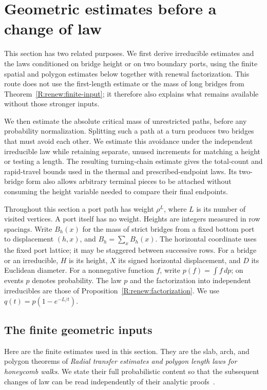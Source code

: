 \section{Geometric estimates before a change of law}\label{R:geo:section}

This section has two related purposes.  We first derive irreducible
estimates and the laws conditioned on bridge height or on two boundary
ports, using the finite spatial and polygon estimates below together
with renewal factorization.  This route does not use the first-length
estimate or the mass of long bridges from Theorem~\ref{R:renew:finite-input};
it therefore also explains what remains available without those stronger
inputs.

We then estimate the absolute critical mass of unrestricted paths, before
any probability normalization.  Splitting such a path at a turn produces
two bridges that must avoid each other.  We estimate this avoidance under
the independent irreducible law while retaining separate, unused
increments for matching a height or testing a length.  The resulting
turning-chain estimate gives the total-count and rapid-travel bounds used
in the thermal and prescribed-endpoint laws.  Its two-bridge form also
allows arbitrary terminal pieces to be attached without consuming the
height variable needed to compare their final endpoints.

Throughout this section a port path has weight $\rho^L$, where $L$ is its
number of visited vertices.  A port itself has no weight.  Heights are
integers measured in row spacings.  Write $B_h(x)$ for the mass of strict
bridges from a fixed bottom port to displacement $(h,x)$, and
$B_h=\sum_xB_h(x)$.  The horizontal coordinate uses the fixed port lattice;
it may be staggered between successive rows.  For a bridge or an
irreducible, $H$ is its height, $X$ its signed horizontal displacement,
and $D$ its Euclidean diameter.  For a nonnegative function $f$, write
$p(f)=\int f\,dp$; on events $p$ denotes probability.  The law $p$ and the
factorization into independent irreducibles are those of
Proposition~\ref{R:renew:factorization}.  We use $q(t)=p(1-e^{-L/t})$.

\subsection{The finite geometric inputs}\label{R:geo:finite-inputs}

Here are the finite estimates used in this section.  They are the slab,
arch, and polygon theorems of \emph{Radial transfer estimates and polygon
length laws for honeycomb walks}.  We state their full probabilistic
content so that the subsequent changes of law can be read independently
of their analytic proofs~\cite[Theorems~1.1, 12.1, 12.2 and
Proposition~3.1]{companionA}.

